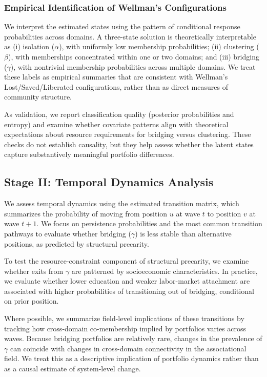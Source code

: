 \subsubsection{Empirical Identification of Wellman's Configurations}

We interpret the estimated states using the pattern of conditional response probabilities across domains. A three-state solution is theoretically interpretable as (i) isolation ($\alpha$), with uniformly low membership probabilities; (ii) clustering ($\beta$), with memberships concentrated within one or two domains; and (iii) bridging ($\gamma$), with nontrivial membership probabilities across multiple domains. We treat these labels as empirical summaries that are consistent with Wellman's Lost/Saved/Liberated configurations, rather than as direct measures of community structure.

As validation, we report classification quality (posterior probabilities and entropy) and examine whether covariate patterns align with theoretical expectations about resource requirements for bridging versus clustering. These checks do not establish causality, but they help assess whether the latent states capture substantively meaningful portfolio differences.


\subsection{Stage II: Temporal Dynamics Analysis}

We assess temporal dynamics using the estimated transition matrix, which summarizes the probability of moving from position $u$ at wave $t$ to position $v$ at wave $t+1$. We focus on persistence probabilities and the most common transition pathways to evaluate whether bridging ($\gamma$) is less stable than alternative positions, as predicted by structural precarity.

To test the resource-constraint component of structural precarity, we examine whether exits from $\gamma$ are patterned by socioeconomic characteristics. In practice, we evaluate whether lower education and weaker labor-market attachment are associated with higher probabilities of transitioning out of bridging, conditional on prior position.

Where possible, we summarize field-level implications of these transitions by tracking how cross-domain co-membership implied by portfolios varies across waves. Because bridging portfolios are relatively rare, changes in the prevalence of $\gamma$ can coincide with changes in cross-domain connectivity in the associational field. We treat this as a descriptive implication of portfolio dynamics rather than as a causal estimate of system-level change.


